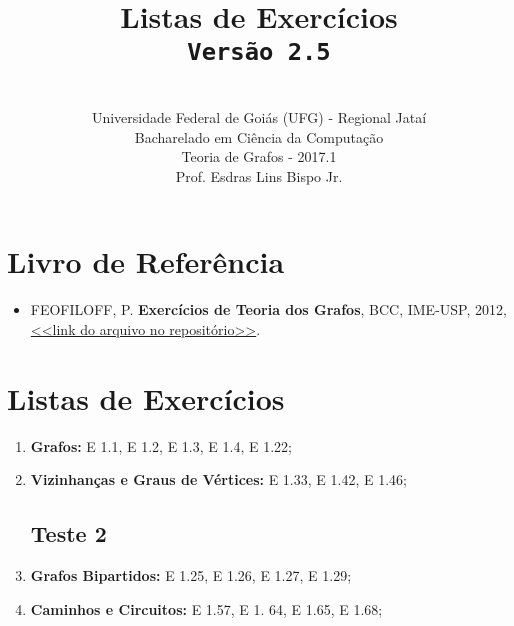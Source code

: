 \documentclass[12pt,a4paper,oneside]{article}
\author{\\Universidade Federal de Goiás (UFG) - Regional Jataí\\Bacharelado em Ciência da Computação \\Teoria de Grafos - 2017.1 \\Prof. Esdras Lins Bispo Jr.}
\date{}
\title{
	\sc \huge Listas de Exercícios 
	\\{\tt Versão 2.5}
}
\begin{document}
\maketitle

\section{Livro de Referência}
	\begin{itemize}
		\item FEOFILOFF, P. {\bf Exercícios de Teoria dos Grafos}, BCC, IME-USP, 2012, \href{https://github.com/bispojr/grafos/raw/master/2017.1/arquivos/exercicios-grafos.pdf}{<<link do arquivo no repositório>>}.
	\end{itemize}
	
\section{Listas de Exercícios}

\begin{enumerate}

	\subsection{Teste 1}
	\item[] {\bf Grafos:} E 1.1, E 1.2, E 1.3, E 1.4, E 1.22;
	\item[] {\bf Vizinhanças e Graus de Vértices:} E 1.33, E 1.42, E 1.46;
	\subsection{Teste 2}
	\item[] {\bf Grafos Bipartidos:} E 1.25, E 1.26, E 1.27, E 1.29;
	\item[] {\bf Caminhos e Circuitos:} E 1.57,	E 1. 64, E 1.65,	E 1.68;

\end{enumerate}
\end{document}

